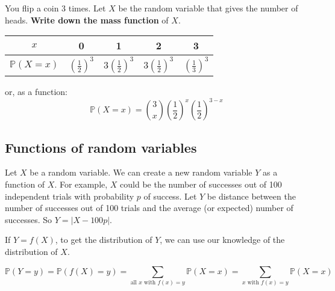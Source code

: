 \documentclass[titlepage, 12pt, leqno]{article}
\begin{document}
\begin{ex}
    You flip a coin 3 times. Let $X$ be the random variable that gives the number
    of heads. \textbf{Write down the mass function} of $X$.

    \begin{center}
    \begin{tabular}{c|c c c c}
        $x$ & 0 & 1&2&3 \\
        \hline
        $\mathbb{P}(X=x)$ & $\left(\frac{1}{2}\right)^3$
                          & $3\left(\frac{1}{2} \right)^3$
                          & $3\left(\frac{1}{2} \right)^3$
                          & $\left(\frac{1}{3} \right)^3$
    \end{tabular}
    \end{center}
    
    or, as a function:
    \[
        \boxed{\mathbb{P}(X = x) = \binom{3}{x}\left(\frac{1}{2}\right)^x\left(\frac{1}{2} \right)^{3-x}}
    \]
\end{ex}

\subsection{Functions of random variables}
Let $X$ be a random variable. We can create a new random variable $Y$ as a 
function of $X$. For example, $X$ could be the number of successes out of 100
independent trials with probability $p$ of success. Let $Y$ be distance between
the number of successes out of 100 trials and the average (or expected) number
of successes. So $Y = |X - 100p|$.

If $Y = f(X)$, to get the distribution of $Y$, we can use our knowledge of the
distribution of $X$.

\[
\mathbb{P}(Y = y) = \mathbb{P}(f(X)=y) = \sum_{ \text{all }x \text{ with }f(x)=y}\mathbb{P}(X=x) = \sum_{x \text{ with } f(x) = y}\mathbb{P}(X=x)
\]
\end{document}
